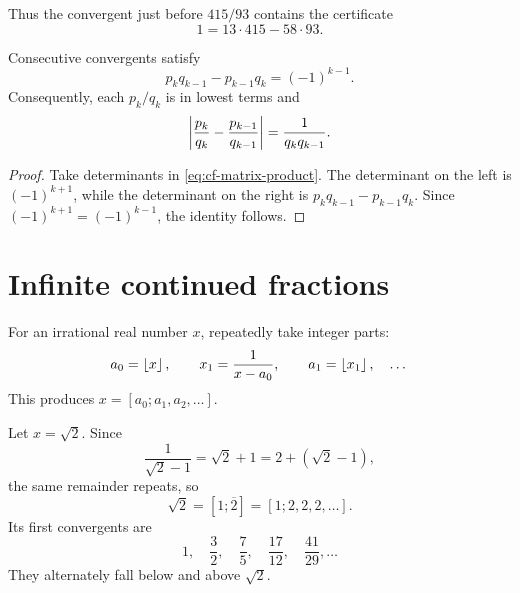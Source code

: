 Thus the convergent just before $415/93$ contains the certificate
\[
  1=13\cdot415-58\cdot93.
\]

\begin{center}
\end{center}

\begin{theorem}
Consecutive convergents satisfy
\[
p_kq_{k-1}-p_{k-1}q_k=(-1)^{k-1}.
\]
Consequently, each $p_k/q_k$ is in lowest terms and
\[
\left|\frac{p_k}{q_k}-\frac{p_{k-1}}{q_{k-1}}\right|=\frac1{q_kq_{k-1}}.
\]
\end{theorem}

\begin{proof}
Take determinants in \eqref{eq:cf-matrix-product}. The determinant on the
left is $(-1)^{k+1}$, while the determinant on the right is
$p_kq_{k-1}-p_{k-1}q_k$. Since $(-1)^{k+1}=(-1)^{k-1}$, the identity follows.
\end{proof}

\section{Infinite continued fractions}

For an irrational real number $x$, repeatedly take integer parts:
\[
a_0=\left\lfloor x\right\rfloor,\qquad x_1=\frac1{x-a_0},\qquad a_1=\left\lfloor x_1\right\rfloor,\quad\dots
\]
This produces $x=[a_0;a_1,a_2,\dots]$.

\begin{example}
Let $x=\sqrt2$. Since
\[
\frac1{\sqrt2-1}=\sqrt2+1=2+(\sqrt2-1),
\]
the same remainder repeats, so
\[
\sqrt2=[1;\overline{2}]=[1;2,2,2,\dots].
\]
Its first convergents are
\[
1,\quad \frac32,\quad\frac75,\quad\frac{17}{12},\quad\frac{41}{29},\dots
\]
They alternately fall below and above $\sqrt2$.
\end{example}

